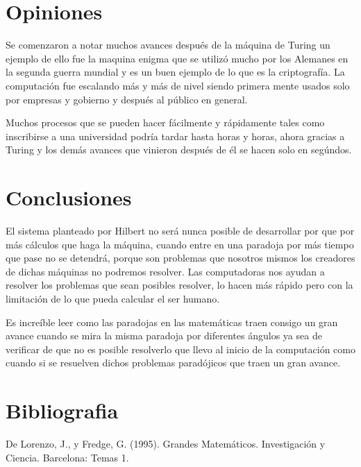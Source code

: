 \documentclass{article}
\begin{document}
\section{Opiniones}
Se comenzaron a notar muchos avances después de la máquina de Turing un ejemplo de ello fue la maquina enigma que se utilizó mucho por los Alemanes en la segunda guerra mundial y es un buen ejemplo de lo que es la criptografía. La computación fue escalando más y más de nivel siendo primera mente usados solo por empresas y gobierno y después al público en general.
\vspace{10pt}

Muchos procesos que se pueden hacer fácilmente y rápidamente tales como inscribirse a una universidad podría tardar hasta horas y horas, ahora gracias a Turing y los demás avances que vinieron después de él se hacen solo en segúndos.

\section{Conclusiones}

El sistema planteado por Hilbert no será nunca posible de desarrollar  por que por más cálculos que haga la máquina, cuando entre en una paradoja por más tiempo que pase no se detendrá, porque son problemas que nosotros mismos los creadores de dichas máquinas no podremos resolver. Las computadoras nos ayudan a resolver los problemas que sean posibles resolver, lo hacen más rápido pero con la limitación de lo que pueda calcular el ser humano.

\vspace{10pt}

Es increíble leer como las paradojas en las matemáticas traen consigo un gran avance cuando se mira la misma paradoja por diferentes ángulos ya sea de verificar de que no es posible resolverlo que llevo al inicio de la computación como cuando si se resuelven dichos problemas paradójicos  que traen un gran avance. 

\vspace{10pt}

\begin{center}
\end{center}

\section{Bibliografia}
De Lorenzo, J., y Fredge, G. (1995). Grandes Matemáticos. Investigación y Ciencia. Barcelona: Temas 1.
\vspace{10pt}
\end{document}

